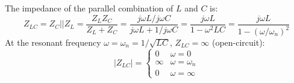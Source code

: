 \documentclass{article}
\begin{document}

The impedance of the parallel combination of $L$ and $C$ is:
\begin{equation} 
  Z_{LC}=Z_C||Z_L=\frac{Z_LZ_C}{Z_L+Z_C}
  =\frac{j\omega L/j\omega C}{j\omega L+1/j\omega C}
  =\frac{j\omega L}{1-\omega^2 LC}
  =\frac{j\omega L}{1-(\omega/\omega_n)^2 } 
\end{equation}
At the resonant frequency $\omega=\omega_n=1/\sqrt{LC}$, $Z_{LC}=\infty$
(open-circuit):
\begin{equation}
  |Z_{LC}|=\left\{\begin{array}{cc}0 & \omega=0\\\infty & \omega=\omega_n\\
  0 & \omega=\infty\end{array}\right.
\end{equation}
\end{document}
